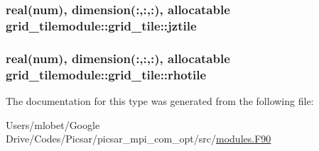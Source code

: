 \subsubsection[{\texorpdfstring{jztile}{jztile}}]{\setlength{\rightskip}{0pt plus 5cm}real(num), dimension(\+:,\+:,\+:), allocatable grid\+\_\+tilemodule\+::grid\+\_\+tile\+::jztile}\hypertarget{structgrid__tilemodule_1_1grid__tile_a9e9a97d720db8d94cb82aa4c6cc933c5}{}\label{structgrid__tilemodule_1_1grid__tile_a9e9a97d720db8d94cb82aa4c6cc933c5}
\subsubsection[{\texorpdfstring{rhotile}{rhotile}}]{\setlength{\rightskip}{0pt plus 5cm}real(num), dimension(\+:,\+:,\+:), allocatable grid\+\_\+tilemodule\+::grid\+\_\+tile\+::rhotile}\hypertarget{structgrid__tilemodule_1_1grid__tile_a002aa3dae3299c95d8d20c3d26e694ff}{}\label{structgrid__tilemodule_1_1grid__tile_a002aa3dae3299c95d8d20c3d26e694ff}


The documentation for this type was generated from the following file\+:\begin{DoxyCompactItemize}
\item 
Users/mlobet/\+Google Drive/\+Codes/\+Picsar/picsar\+\_\+mpi\+\_\+com\+\_\+opt/src/\hyperlink{modules_8_f90}{modules.\+F90}\end{DoxyCompactItemize}
